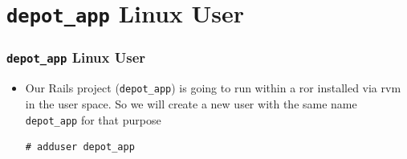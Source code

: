 \documentclass{beamer}
\begin{document}
\section{\texttt{depot\_app} Linux User }
\begin{frame}[fragile]
\frametitle{\texttt{depot\_app} Linux User}
\begin{itemize}

\item Our Rails project (\texttt{depot\_app}) is going to run within a \acrshort{ror} installed via \acrshort{rvm} in the user space. So we will create a new  user with the same name \texttt{depot\_app} for that purpose

\lstset{language=shell, escapechar=!}
\begin{lstlisting}[escapechar=!]
# adduser depot_app
\end{lstlisting}


\end{itemize}


\end{frame}
\end{document}
